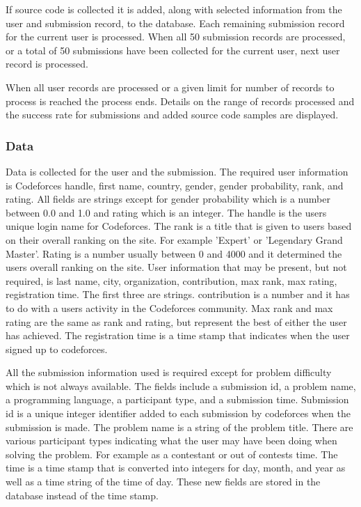 \documentclass[12pt]{article}
\begin{document}
If source code is collected it is added, along with selected information from the user and submission record, to the database. Each remaining submission record for the current user is processed. When all 50 submission records are processed, or a total of 50 submissions have been collected for the current user, next user record is processed.

When all user records are processed or a given limit for number of records to process is reached the process ends. Details on the range of records processed and the success rate for submissions and added source code samples are displayed.

\subsubsection*{Data}
Data is collected for the user and the submission. The required user information is Codeforces handle, first name, country, gender, gender probability, rank, and rating. All fields are strings except for gender probability which is a number between 0.0 and 1.0 and rating which is an integer. The handle is the users unique login name for Codeforces. The rank is a title that is given to users based on their overall ranking on the site. For example 'Expert' or 'Legendary Grand Master'. Rating is a number usually between 0 and 4000 and it determined the users overall ranking on the site. User information that may be present, but not required, is last name, city, organization, contribution, max rank, max rating, registration time. The first three are strings. contribution is a number and it has to do with a users activity in the Codeforces community. Max rank and max rating are the same as rank and rating, but represent the best of either the user has achieved. The registration time is a time stamp that indicates when the user signed up to codeforces.

All the submission information used is required except for problem difficulty which is not always available. The fields include a submission id, a problem name, a programming language, a participant type, and a submission time. Submission id is a unique integer identifier added to each submission by codeforces when the submission is made. The problem name is a string of the problem title. There are various participant types indicating what the user may have been doing when solving the problem. For example as a contestant or out of contests time. The time is a time stamp that is converted into integers for day, month, and year as well as a time string of the time of day. These new fields are stored in the database instead of the time stamp.
\end{document}
